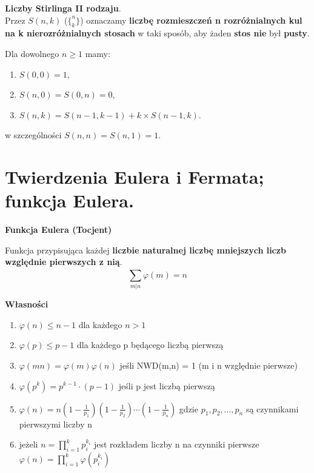 \documentclass[main.tex]{subfiles}
\begin{document}
    \begin{definition}
        \textbf{Liczby Stirlinga II rodzaju}.\\
        Przez $S(n,k)$ ($\{^n_k\}$) oznaczamy \textbf{liczbę rozmieszczeń n rozróżnialnych kul na k nierozróżnialnych
        stosach} w taki sposób, aby żaden \textbf{stos nie} był \textbf{pusty}.

        Dla dowolnego $n \geq 1$ mamy:
        \begin{enumerate}
            \item $S(0,0) = 1$,
            \item $S(n,0) = S(0,n) = 0$,
            \item $S(n,k) = S(n-1, k-1) + k \times S(n-1, k)$.
        \end{enumerate}
        w szczególności  $S(n,n) = S(n,1) = 1$.\\
    \end{definition}


    \section{Twierdzenia Eulera i Fermata; funkcja Eulera.}
    \begin{definition}
        \textbf{Funkcja Eulera (Tocjent)}

        Funkcja przypisująca każdej \textbf{liczbie naturalnej liczbę mniejszych liczb względnie pierwszych z nią}.
        \[\sum_{m|n}^{} \varphi(m) = n\]
    \end{definition}

    \textbf{Własności}
    \begin{enumerate}
        \item $\varphi (n) \leq n - 1$  dla każdego $n>1$
        \item $\varphi (p) \leq p - 1$ dla każdego p będącego liczbą pierwszą
        \item $\varphi (mn) = \varphi (m)\varphi(n)$ jeśli NWD(m,n) = 1 (m i n względnie pierwsze)
        \item $\varphi(p^{k}) = p^{k-1} \cdot (p-1)$ jeśli p jest liczbą pierwszą
        \item $\varphi(n) = n
        \left (  1 - \frac{1}{p_1}\right)
        \left (  1 - \frac{1}{p_2}\right)
        \cdots
        \left (  1 - \frac{1}{p_n}\right)$
        gdzie $p_1, p_2, \dots, p_n$ są czynnikami pierwszymi liczby n
        \item jeżeli $n = \prod_{i=1}^{k} p_i^{k_i}$ jest rozkładem liczby n na czynniki pierwsze $\varphi (n) = \prod_{i=1}^{k} \varphi \left( p_i^{k_i} \right )$
    \end{enumerate}
\end{document}
